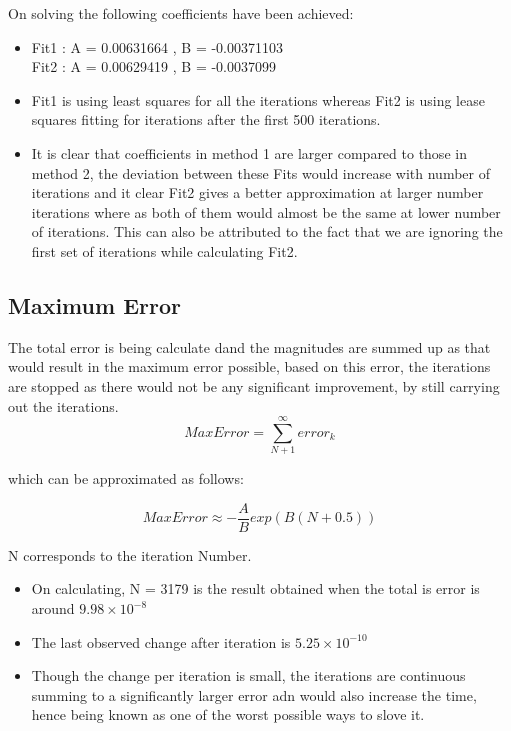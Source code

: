 \documentclass[11pt, a4paper]{article}
\begin{document}
 		On solving the following coefficients have been achieved:
 		
		\begin{itemize}
			\item 
			Fit1 : A = 0.00631664 , B = -0.00371103\\
			Fit2 : A = 0.00629419 , B = -0.0037099\\
		\item
		Fit1 is using least squares for all the iterations whereas Fit2 is using lease squares fitting for iterations after the first 500 iterations.
		\item
		It is clear that coefficients in method 1 are larger compared to those in method 2, the deviation between these Fits would increase with number of iterations and it clear Fit2 gives a better approximation at larger number iterations where as both of them would almost be the same at lower number of iterations. This can also be attributed to the fact that we are ignoring the first set of iterations while calculating Fit2.
            
            \end{itemize}

            \subsection{Maximum Error}
           The total error is being calculate dand the magnitudes are summed up as that would result in the maximum error possible, based on this error, the iterations are stopped as there would not be any significant improvement, by still carrying out the iterations.\\
	 \begin{equation}
    		Max Error = \sum_{N+1}^{\infty}error_k
  	\end{equation}

	which can be approximated as follows:

	\begin{equation}
	    Max Error \approx -\frac{A}{B}exp(B(N+0.5))
    	\end{equation}
    	
    	N corresponds to the iteration Number.
    	
    	\begin{itemize}                
          \item
          On calculating, N = 3179 is the result obtained when the total is error is around \(9.98 \times 10^{-8}\) 
          \item
          The last observed change after iteration is \(5.25 \times 10^{-10}\)
          \item
          Though the change per iteration is small, the iterations are continuous summing to a significantly larger error adn would also increase the time, hence being known as one of the worst possible ways to slove it.
        \end{itemize}  
           
\end{document}
